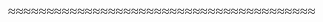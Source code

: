 \documentclass[UTF8,a4paper]{ctexart}
\let\heiti\relax %
\begin{document}
\begin{sloppypar} %
\begin{multicols}{2}       %

    \heiti{}
\end{multicols}
\columnseprule=0pt         %
≈≈≈≈≈≈≈≈≈≈≈≈≈≈≈≈≈≈≈≈≈≈≈≈≈≈≈≈≈≈≈≈≈≈≈≈≈≈≈≈





\end{sloppypar} 
\end{document}
